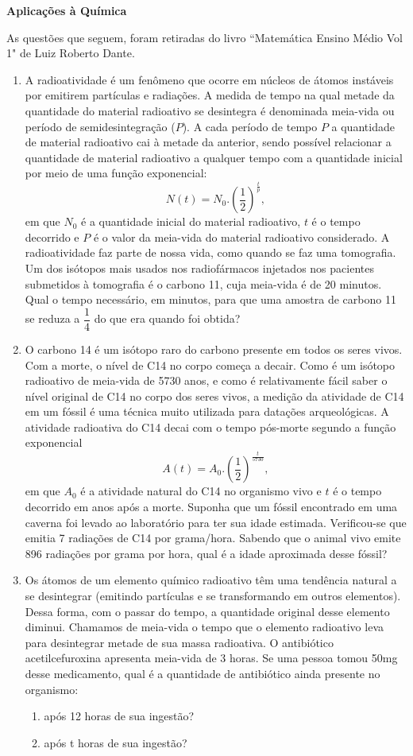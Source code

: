 \begin{center}
\textbf{Aplicações à Química}
\end{center}

As questões que seguem, foram retiradas do livro ``Matemática Ensino Médio Vol 1" de Luiz Roberto Dante.
\begin{enumerate}
\item A radioatividade é um fenômeno que ocorre em núcleos de átomos instáveis por emitirem partículas e radiações. A medida de tempo na qual metade da quantidade do material radioativo se desintegra é denominada meia-vida ou período de semidesintegração ($P$). A cada período de tempo $P$ a quantidade de material radioativo cai à metade da anterior, sendo possível relacionar a quantidade de material radioativo a qualquer tempo com a quantidade inicial por meio de uma função exponencial: 
$$N(t)=N_0 . \left(\dfrac{1}{2}\right)^{\frac{t}{p}},$$
em que $N_0$ é a quantidade inicial do material radioativo, $t$ é o tempo decorrido e $P$ é o valor da meia-vida do material radioativo considerado. A radioatividade faz parte de nossa vida, como quando se faz uma tomografia. Um dos isótopos mais usados nos radiofármacos injetados nos pacientes submetidos à tomografia é o carbono 11, cuja meia-vida é de 20 minutos. Qual o tempo necessário, em minutos, para que uma amostra de carbono 11 se reduza a $\dfrac{1}{4}$ do que era quando foi obtida?

\item O carbono 14 é um isótopo raro do carbono presente em todos os seres vivos. Com a morte, o nível de C14 no corpo começa a decair. Como é um isótopo radioativo de meia-vida de 5730 anos, e como é relativamente fácil saber o nível original de C14 no corpo dos seres vivos, a medição da atividade de C14 em um fóssil é uma técnica muito utilizada para datações arqueológicas. A atividade radioativa do C14 decai com o tempo pós-morte segundo a função exponencial
\[A(t)=A_0 . \left(\dfrac{1}{2}\right)^{\frac{t}{5730}},\]
em que $A_0$ é a atividade natural do C14 no organismo vivo e $t$ é o tempo decorrido em anos após a morte. Suponha que um fóssil encontrado em uma caverna foi levado ao laboratório para ter sua idade estimada. Verificou-se que emitia 7 radiações de C14 por grama/hora. Sabendo que o animal vivo emite 896 radiações por grama por hora, qual é a idade aproximada desse fóssil?

\item Os átomos de um elemento químico radioativo têm uma tendência natural a se desintegrar (emitindo partículas e se transformando em outros elementos). Dessa forma, com o passar do tempo, a quantidade original desse elemento diminui. Chamamos de meia-vida o tempo que o elemento radioativo leva para desintegrar metade de sua massa radioativa. O antibiótico acetilcefuroxina apresenta meia-vida de 3 horas. Se uma pessoa tomou 50mg desse medicamento, qual é a quantidade de antibiótico ainda presente no organismo:
\begin{enumerate}
\item após 12 horas de sua ingestão?
\item após t horas de sua ingestão?
\end{enumerate}


\end{enumerate}

